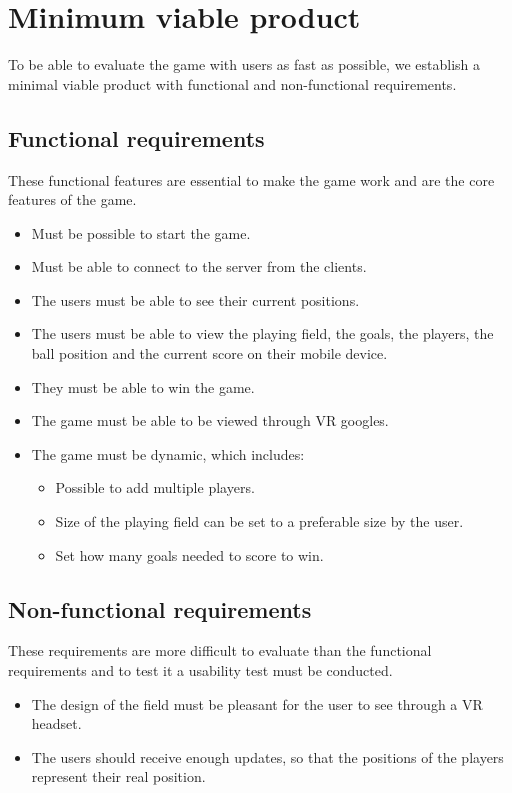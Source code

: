 \section{Minimum viable product}
To be able to evaluate the game with users as fast as possible, we establish a minimal viable product with functional and non-functional requirements.

\subsection{Functional requirements}
These functional features are essential to make the game work and are the core features of the game.

\begin{itemize}
    \item Must be possible to start the game.
    \item Must be able to connect to the server from the clients.
    \item The users must be able to see their current positions.
    \item The users must be able to view the playing field, the goals, the players, the ball position and the current score on their mobile device.
    \item They must be able to win the game.
    \item The game must be able to be viewed through VR googles.
    \item The game must be dynamic, which includes:
          \begin{itemize}
              \item Possible to add multiple players.
              \item Size of the playing field can be set to a preferable size by the user.
              \item Set how many goals needed to score to win.
          \end{itemize}
\end{itemize}

\subsection{Non-functional requirements}
These requirements are more difficult to evaluate than the functional requirements and to test it a usability test must be conducted.
\begin{itemize}
    \item The design of the field must be pleasant for the user to see through a VR headset.
    \item The users should receive enough updates, so that the positions of the players represent their real position.
\end{itemize}